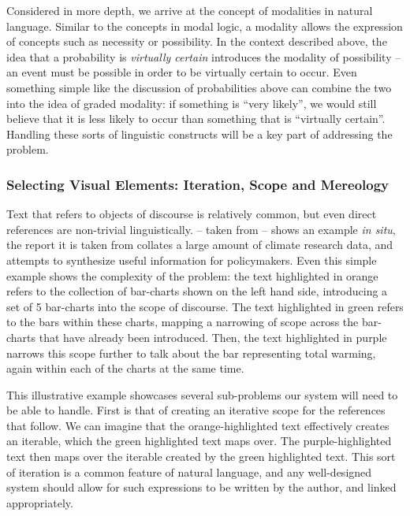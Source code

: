 Considered in more depth, we arrive at the concept of modalities in natural language. Similar to 
the concepts in modal logic, a modality allows the expression of concepts such as necessity or possibility.
In the context described above, the idea that a probability is \emph{virtually certain} introduces the modality of
possibility -- an event must be possible in order to be virtually certain to occur. Even something simple
like the discussion of probabilities above can combine the two into the idea of graded modality:
if something is ``very likely'', we would still believe that it is less likely to occur than something that
is ``virtually certain''. Handling these sorts of linguistic constructs will be a key part of addressing
the problem. 

\subsubsection{Selecting Visual Elements: Iteration, Scope and Mereology}
Text that refers to objects of discourse is relatively common, but even direct references are non-trivial 
linguistically.  -- taken from \cite{lee23} -- shows an example \textit{in situ},
the report it is taken from collates a large amount of climate research data, and attempts to synthesize
useful information for policymakers. Even this simple example shows the complexity of the problem: the text highlighted
in orange refers to the collection of bar-charts shown on the left hand side, introducing a set of 5 bar-charts
into the scope of discourse. The text highlighted in green refers to the bars within these charts, mapping 
a narrowing of scope across the bar-charts that have already been introduced. Then, the text highlighted in
purple narrows this scope further to talk about the bar representing total warming, again within each of the
charts at the same time. 

This illustrative example showcases several sub-problems our system will need to be able to handle. First
is that of creating an iterative scope for the references that follow. We can imagine that the orange-highlighted
text effectively creates an iterable, which the green highlighted text maps over. The purple-highlighted text
then maps over the iterable created by the green highlighted text. This sort of iteration is a common feature of natural language,
and any well-designed system should allow for such expressions to be written by the author, and linked appropriately.

